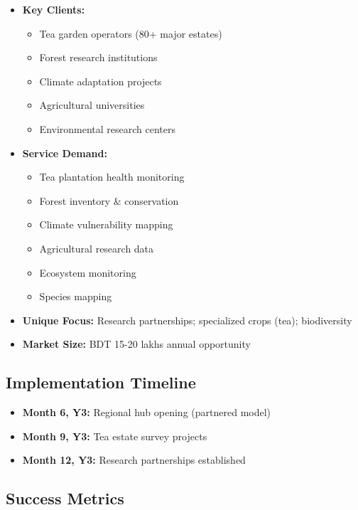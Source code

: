 \begin{itemize}
    \item \textbf{Key Clients:}
    \begin{itemize}
        \item Tea garden operators (80+ major estates)
        \item Forest research institutions
        \item Climate adaptation projects
        \item Agricultural universities
        \item Environmental research centers
    \end{itemize}

    \item \textbf{Service Demand:}
    \begin{itemize}
        \item Tea plantation health monitoring
        \item Forest inventory \& conservation
        \item Climate vulnerability mapping
        \item Agricultural research data
        \item Ecosystem monitoring
        \item Species mapping
    \end{itemize}

    \item \textbf{Unique Focus:} Research partnerships; specialized crops (tea); biodiversity

    \item \textbf{Market Size:} BDT 15-20 lakhs annual opportunity
\end{itemize}

\subsection{Implementation Timeline}

\begin{itemize}
    \item \textbf{Month 6, Y3:} Regional hub opening (partnered model)
    \item \textbf{Month 9, Y3:} Tea estate survey projects
    \item \textbf{Month 12, Y3:} Research partnerships established
\end{itemize}

\subsection{Success Metrics}


